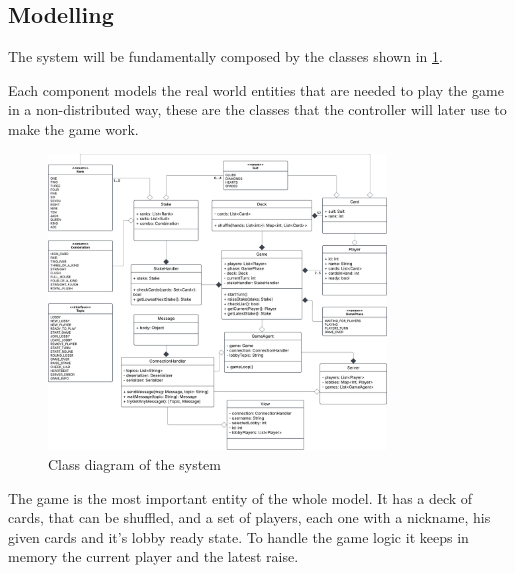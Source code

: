 \documentclass{scrartcl}
\begin{document}
\subsection{Modelling}\label{modelling}

The system will be fundamentally composed by the classes shown in \cref{fig:classes}.

Each component models the real world entities that are needed to play the game in a non-distributed
way, these are the classes that the controller will later use to make the game work.
\begin{figure}
      \centering
      \includegraphics[width=0.8\textwidth]{figures/classes.png}
      \caption{Class diagram of the system}
      \label{fig:classes}
\end{figure}

The game is the most important entity of the whole model. It has a deck of cards, that can be shuffled,
and a set of players, each one with a nickname, his given cards and it's lobby ready state.
To handle the game logic it keeps in memory the current player and the latest raise.
\end{document}
